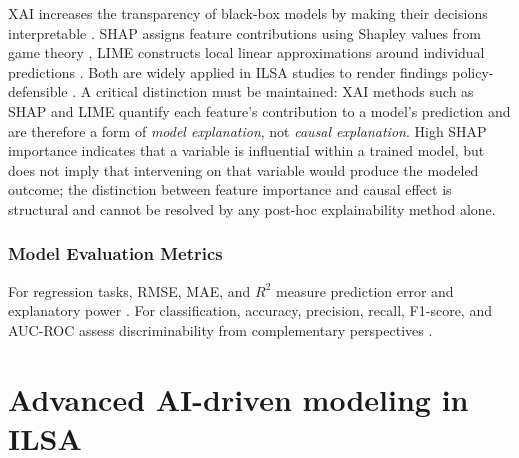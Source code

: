 \documentclass{ieeeaccess}
\begin{document}
XAI increases the transparency of black-box models by making their decisions interpretable \cite{das-rad2020}. SHAP assigns feature contributions using Shapley values from game theory \cite{lundberg-etal2019}, LIME constructs local linear approximations around individual predictions \cite{garreau-damien2020}. Both are widely applied in ILSA studies to render findings policy-defensible \cite{hu-etal-Predicting-Adolescents-2025, elouafi-etal2025}. A critical distinction must be maintained: XAI methods such as SHAP and LIME quantify each feature's contribution to a model's prediction and are therefore a form of \emph{model explanation}, not \emph{causal explanation}. High SHAP importance indicates that a variable is influential within a trained model, but does not imply that intervening on that variable would produce the modeled outcome; the distinction between feature importance and causal effect is structural and cannot be resolved by any post-hoc explainability method alone.

\subsubsection{Model Evaluation Metrics}

For regression tasks, RMSE, MAE, and $R^2$ measure prediction error and explanatory power \cite{zollanvari2023}. For classification, accuracy, precision, recall, F1-score, and AUC-ROC assess discriminability from complementary perspectives \cite{fergus-etal2022, zhang-sun-xue2024}.

\section{Advanced AI-driven modeling in ILSA }\label{sec4}
\end{document}
